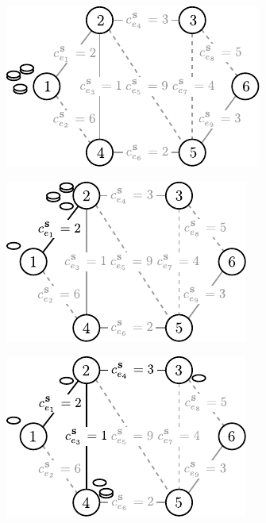 \begin{figure}[!htbp]
	\null\hfill
	\begin{subfigure}[b]{0.254\textwidth}
		\includegraphics[width=\textwidth]{Chapter_III/MST2-example/a}
		\caption{}
		\label{fig:mst2Example:a}
	\end{subfigure}
	\hfill
	\begin{subfigure}[b]{0.242\textwidth}
		\includegraphics[width=\textwidth]{Chapter_III/MST2-example/b}
		\caption{}
		\label{fig:mst2Example:b}
	\end{subfigure}
		\hfill
	\begin{subfigure}[b]{0.242\textwidth}
		\includegraphics[width=\textwidth]{Chapter_III/MST2-example/c}

\end{subfigure}
\end{figure}
